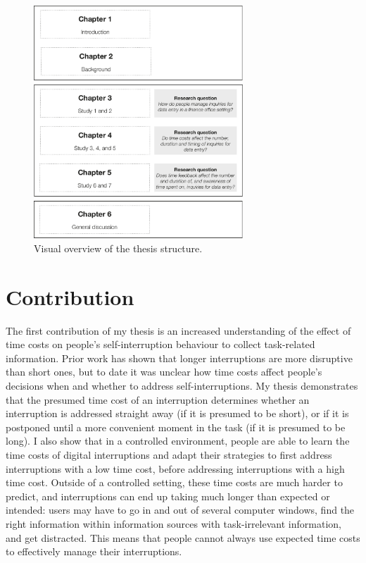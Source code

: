 \begin{figure}
\centering
\includegraphics[width=0.7\textwidth]{images/ThesisOverview.pdf}
\caption{Visual overview of the thesis structure.}
\label{fig:ch1-thesisoverview}
\end{figure}

\section{Contribution}
The first contribution of my thesis is an increased understanding of the effect of time costs on people's self-interruption behaviour to collect task-related information. Prior work has shown that longer interruptions are more disruptive than short ones, but to date it was unclear how time costs affect people's decisions when and whether to address self-interruptions. My thesis demonstrates that the presumed time cost of an interruption determines whether an interruption is addressed straight away (if it is presumed to be short), or if it is postponed until a more convenient moment in the task (if it is presumed to be long). I also show that in a controlled environment, people are able to learn the time costs of digital interruptions and adapt their strategies to first address interruptions with a low time cost, before addressing interruptions with a high time cost. Outside of a controlled setting, these time costs are much harder to predict, and interruptions can end up taking much longer than expected or intended: users may have to go in and out of several computer windows, find the right information within information sources with task-irrelevant information, and get distracted. This means that people cannot always use expected time costs to effectively manage their interruptions. 

